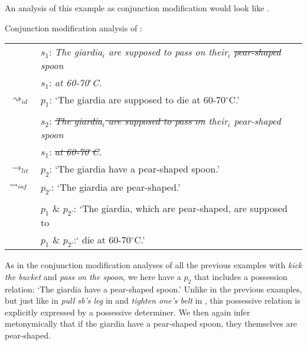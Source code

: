 \documentclass[output=paper]{langsci/langscibook}
\begin{document}
\noindent An analysis of this example as conjunction modification would look like .

\ea \label{analysis1 pear-shaped spoon} 
Conjunction modification analysis of : \\
\vspace{5pt}
\begin{tabular}{ll}
								& 	$s_{1}$: \hspace{4pt} \textit{The giardia$_{i}$ are supposed to pass on their$_{i}$ \sout{pear-shaped} spoon} \\
								&	{\white $s_{1}$:} \hspace{4pt} \textit{at 60-70$^\circ$C.} \\
$\rightsquigarrow_{id}$				&	$p_{1}$: \hspace{1pt} `The giardia are supposed to die at 60-70$^\circ$C.' \\
\vspace{-5pt} \\
								& 	$s_{2}$: \hspace{4pt} \textit{\sout{The giardia$_{i}$ are supposed to pass on} their$_{i}$ pear-shaped spoon} \\
								&	{\white $s_{1}$:} \hspace{4pt} \textit{\sout{at 60-70$^\circ$C}.} \\
$\rightarrow_{lit}$					&	$p_{2}$: \hspace{1pt} `The giardia have a pear-shaped spoon.' \\
$\rightsquigarrow_{in\hspace{-0.8pt} f}$	&	$p_{2'}$: \hspace{-1.5pt} `The giardia are pear-shaped.' \\
\vspace{-5pt} \\
								&	$p_{1}$ \& $p_{2'}$: `The giardia, which are pear-shaped, are supposed to \\
								&	{\white $p_{1}$ \& $p_{2'}$:`} die at 60-70$^\circ$C.' 
\end{tabular}
\z

\noindent As in the conjunction modification analyses of all the previous examples with \textit{kick the bucket} and \textit{pass on the spoon}, we here have a $p_{2}$ that includes a possession relation: `The giardia have a pear-shaped spoon.' Unlike in the previous examples, %
but just like in \textit{pull sb's leg} in  and \textit{tighten one's belt} in , this possessive relation is explicitly expressed by a possessive determiner. We then again infer metonymically that if the giardia have a pear-shaped spoon, they themselves are pear-shaped.
\end{document}
